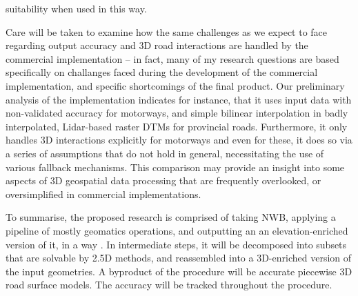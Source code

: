 suitability when used in this way.

Care will be taken to examine how the same challenges as we expect to face regarding output accuracy and 3D road interactions are handled by the commercial implementation – in fact, many of my research questions are based specifically on challanges faced during the development of the commercial implementation, and specific shortcomings of the final product. Our preliminary analysis of the implementation indicates for instance, that it uses input data with non-validated accuracy for motorways, and simple bilinear interpolation in badly interpolated, Lidar-based raster DTMs for provincial roads. Furthermore, it only handles 3D interactions explicitly for motorways and even for these, it does so via a series of assumptions that do not hold in general, necessitating the use of various fallback mechanisms. This comparison may provide an insight into some aspects of 3D geospatial data processing that are frequently overlooked, or oversimplified in commercial implementations.

To summarise, the proposed research is comprised of taking NWB, applying a pipeline of mostly geomatics operations, and outputting an an elevation-enriched version of it, in a way . In intermediate steps, it will be decomposed into subsets that are solvable by 2.5D methods, and reassembled into a 3D-enriched version of the input geometries. A byproduct of the procedure will be accurate piecewise 3D road surface models. The accuracy will be tracked throughout the procedure.